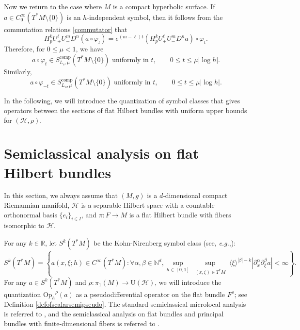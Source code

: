 \documentclass[11pt,oneside,reqno]{amsart}
\newcommand\Oph{\ensuremath{\mathrm{Op}_h}}
\theoremstyle{definition}
\numberwithin{equation}{section}
\theoremstyle{plain}
\begin{document}
Now we return to the case where $M$ is a compact hyperbolic surface. If $a \in C_0^{\infty} (T^* M \setminus \{0\} )$ is an $h$-independent symbol, then it follows from the commutation relations \eqref{commutator} that
\begin{equation}\label{derivativeoffunction}
H_p^k U_{+}^{\ell} U_{-}^m D^n (a \circ \varphi_t )=e^{(m-\ell) t} (H_p^k U_{+}^{\ell} U_{-}^m D^n a ) \circ \varphi_t.
\end{equation}
Therefore, for $0\leq \mu<1$, we have
\begin{equation}\label{propogationofsymbol}
a\circ \varphi_{t} \in S_{L_s, \mu}^{\mathrm{comp}} (T^*M\setminus \{0\} )\text{ uniformly in }t, \qquad 0\leq t\leq \mu |\log h |.
\end{equation}
Similarly, 
\begin{equation}\label{propogationofsymbol2}
 a\circ \varphi_{-t} \in S_{L_u, \mu}^{\mathrm{comp}} (T^*M\setminus \{0\} )\text{ uniformly in }t, \qquad 0\leq t\leq \mu |\log h |.
\end{equation}

In the following, we will introduce the quantization of symbol classes that gives operators between the sections of flat Hilbert bundles with uniform upper bounds for $(\mathcal{H},\rho)$.



\section{Semiclassical analysis on flat Hilbert bundles}
\label{sec:quantization on flat bundles}
In this section, we always assume that $(M,g)$ is a $d$-dimensional compact Riemannian manifold, $\mathcal{H}$ is a separable Hilbert space with a countable orthonormal basis $\{e_i\}_{i \in I}$, and $\pi:F\rightarrow M$ is a flat Hilbert bundle with fibers isomorphic to $\mathcal{H}$.


For any $k\in \mathbb{R}$, let $S^k(T^*M)$ be the Kohn-Nirenberg symbol class (see, \emph{e.g.},\cite[(E.1.6)]{dyatlovzworski2019resonances}):
\begin{equation}\label{standardsymbolclass}
    S^k(T^*M)=\left\{  a(x,\xi;h) \in C^\infty(T^*M):\forall \alpha,\beta \in \mathbb{N}^d,\sup _{h \in\left(0,1\right]} \sup _{\substack{(x,\xi)  \in T^*M  }}\langle\xi\rangle^{|\beta|-k} |\partial_x^\alpha \partial_{\xi}^\beta a  |<\infty \right\}.
\end{equation}
For any $a \in S^k(T^*M)$ and $\rho:\pi_1(M)\to \mathrm{U}(\mathcal{H})$, we will introduce the quantization $\Oph^\rho(a)$ as a pseudodifferential operator on the flat bundle $F^\rho$; see Definition \ref{defofscalarsemipseudo}. The standard semiclassical microlocal analysis is referred to \cite{DimassiSjostrand99,zworski2012semiclassicalanalysis,dyatlovzworski2019resonances}, and the semiclassical analysis on flat bundles and principal bundles with finite-dimensional fibers is referred to \cite{mama2024semiclassical,cekiclefeuvre2024semiclassical}.
\end{document}
